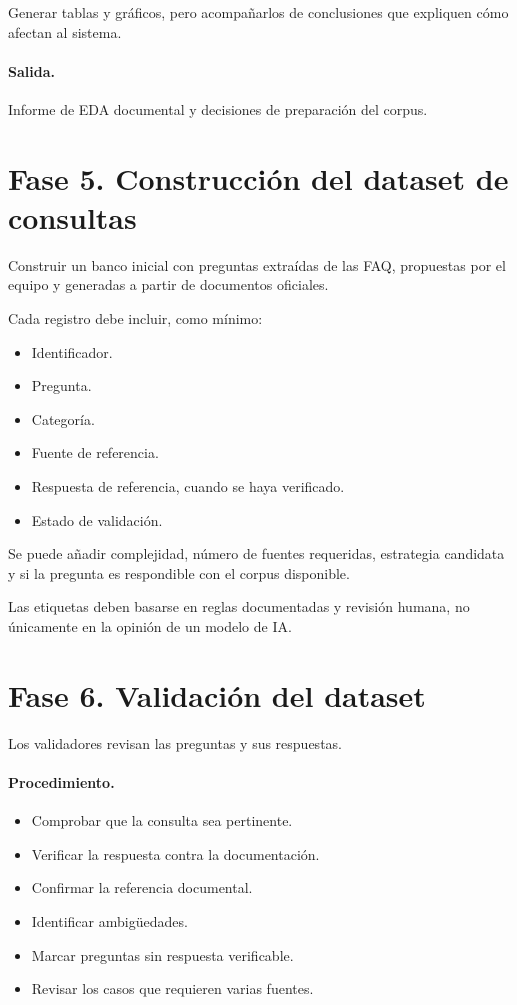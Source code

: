 \documentclass[11pt,a4paper]{article}
\begin{document}
Generar tablas y gráficos, pero acompañarlos de conclusiones que expliquen cómo afectan al sistema.

\paragraph{Salida.}
Informe de EDA documental y decisiones de preparación del corpus.

\section{Fase 5. Construcción del dataset de consultas}

Construir un banco inicial con preguntas extraídas de las FAQ, propuestas por el equipo y generadas a partir de documentos oficiales.

Cada registro debe incluir, como mínimo:

\begin{itemize}
  \item Identificador.
  \item Pregunta.
  \item Categoría.
  \item Fuente de referencia.
  \item Respuesta de referencia, cuando se haya verificado.
  \item Estado de validación.
\end{itemize}

Se puede añadir complejidad, número de fuentes requeridas, estrategia candidata y si la pregunta es respondible con el corpus disponible.

Las etiquetas deben basarse en reglas documentadas y revisión humana, no únicamente en la opinión de un modelo de IA.

\section{Fase 6. Validación del dataset}

Los validadores revisan las preguntas y sus respuestas.

\paragraph{Procedimiento.}
\begin{itemize}
  \item Comprobar que la consulta sea pertinente.
  \item Verificar la respuesta contra la documentación.
  \item Confirmar la referencia documental.
  \item Identificar ambigüedades.
  \item Marcar preguntas sin respuesta verificable.
  \item Revisar los casos que requieren varias fuentes.
\end{itemize}
\end{document}
